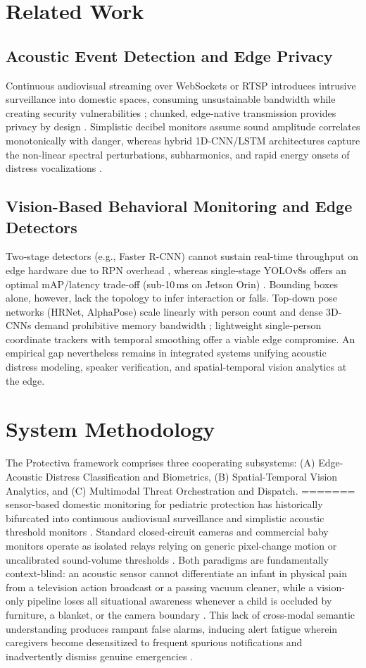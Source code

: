 \documentclass[conference]{IEEEtran}
\begin{document}
\section{Related Work}
\subsection{Acoustic Event Detection and Edge Privacy}
Continuous audiovisual streaming over WebSockets or RTSP introduces intrusive surveillance into domestic spaces, consuming unsustainable bandwidth while creating security vulnerabilities \cite{b1}; chunked, edge-native transmission provides privacy by design \cite{b2}. Simplistic decibel monitors assume sound amplitude correlates monotonically with danger, whereas hybrid 1D-CNN/LSTM architectures capture the non-linear spectral perturbations, subharmonics, and rapid energy onsets of distress vocalizations \cite{b3, b7, b8}.

\subsection{Vision-Based Behavioral Monitoring and Edge Detectors}
Two-stage detectors (e.g., Faster R-CNN) cannot sustain real-time throughput on edge hardware due to RPN overhead \cite{b11}, whereas single-stage YOLOv8s offers an optimal mAP/latency trade-off (sub-10\,ms on Jetson Orin) \cite{b11}. Bounding boxes alone, however, lack the topology to infer interaction or falls. Top-down pose networks (HRNet, AlphaPose) scale linearly with person count \cite{b12} and dense 3D-CNNs demand prohibitive memory bandwidth \cite{b14}; lightweight single-person coordinate trackers with temporal smoothing offer a viable edge compromise. An empirical gap nevertheless remains in integrated systems unifying acoustic distress modeling, speaker verification, and spatial-temporal vision analytics at the edge.

\section{System Methodology}
The Protectiva framework comprises three cooperating subsystems: (A) Edge-Acoustic Distress Classification and Biometrics, (B) Spatial-Temporal Vision Analytics, and (C) Multimodal Threat Orchestration and Dispatch.
=======
 sensor-based domestic monitoring for pediatric protection has historically bifurcated into continuous audiovisual surveillance and simplistic acoustic threshold monitors \cite{b2}. Standard closed-circuit cameras and commercial baby monitors operate as isolated relays relying on generic pixel-change motion or uncalibrated sound-volume thresholds \cite{b3, b14}. Both paradigms are fundamentally context-blind: an acoustic sensor cannot differentiate an infant in physical pain from a television action broadcast or a passing vacuum cleaner, while a vision-only pipeline loses all situational awareness whenever a child is occluded by furniture, a blanket, or the camera boundary \cite{b17}. This lack of cross-modal semantic understanding produces rampant false alarms, inducing alert fatigue wherein caregivers become desensitized to frequent spurious notifications and inadvertently dismiss genuine emergencies \cite{b10}.
\end{document}
